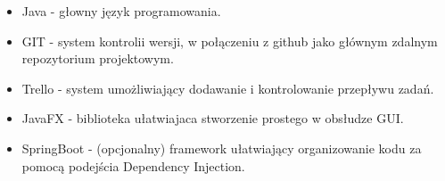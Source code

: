 
\begin{itemize}
	\item Java - głowny język programowania.
	\item GIT - system kontrolii wersji, w połączeniu z github jako głównym zdalnym repozytorium projektowym.
	\item Trello - system umożliwiający dodawanie i kontrolowanie przepływu zadań.
	\item JavaFX - biblioteka ułatwiajaca stworzenie prostego w obsłudze GUI.
	\item SpringBoot - (opcjonalny) framework ułatwiający organizowanie kodu za pomocą podejścia Dependency Injection.
\end{itemize}
